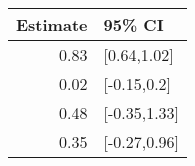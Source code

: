 \begin{tabular}{rl}
  \hline
Estimate & 95\% CI \\ 
  \hline
0.83 & [0.64,1.02] \\ 
  0.02 & [-0.15,0.2] \\ 
  0.48 & [-0.35,1.33] \\ 
  0.35 & [-0.27,0.96] \\ 
   \hline
\end{tabular}

